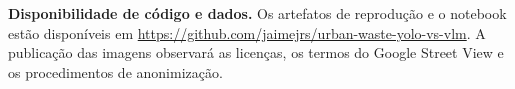 \documentclass[kdmile,a4paper]{kdmile}
\begin{document}
\noindent\textbf{Disponibilidade de código e dados.} Os artefatos de reprodução e o notebook estão disponíveis em \url{https://github.com/jaimejrs/urban-waste-yolo-vs-vlm}. A publicação das imagens observará as licenças, os termos do Google Street View e os procedimentos de anonimização.




\begin{received}
\end{received}
\end{document}
